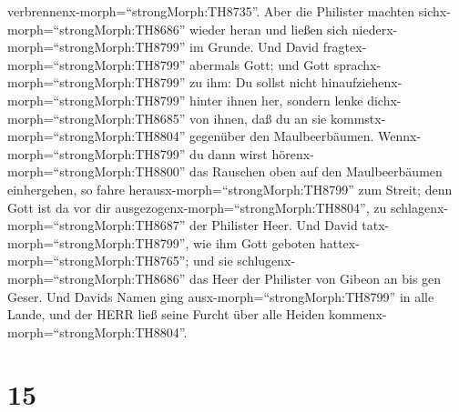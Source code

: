 verbrennenx-morph=``strongMorph:TH8735''.  Aber die
Philister machten sichx-morph=``strongMorph:TH8686'' wieder heran und
ließen sich niederx-morph=``strongMorph:TH8799'' im Grunde.
 Und David fragtex-morph=``strongMorph:TH8799'' abermals
Gott; und Gott sprachx-morph=``strongMorph:TH8799'' zu ihm: Du sollst
nicht hinaufziehenx-morph=``strongMorph:TH8799'' hinter ihnen her,
sondern lenke dichx-morph=``strongMorph:TH8685'' von ihnen, daß du an
sie kommstx-morph=``strongMorph:TH8804'' gegenüber den Maulbeerbäumen.
 Wennx-morph=``strongMorph:TH8799'' du dann wirst
hörenx-morph=``strongMorph:TH8800'' das Rauschen oben auf den
Maulbeerbäumen einhergehen, so fahre
herausx-morph=``strongMorph:TH8799'' zum Streit; denn Gott ist da vor
dir ausgezogenx-morph=``strongMorph:TH8804'', zu
schlagenx-morph=``strongMorph:TH8687'' der Philister Heer. 
Und David tatx-morph=``strongMorph:TH8799'', wie ihm Gott geboten
hattex-morph=``strongMorph:TH8765''; und sie
schlugenx-morph=``strongMorph:TH8686'' das Heer der Philister von Gibeon
an bis gen Geser.  Und Davids Namen ging
ausx-morph=``strongMorph:TH8799'' in alle Lande, und der HERR ließ seine
Furcht über alle Heiden kommenx-morph=``strongMorph:TH8804''.

\hypertarget{section-14}{%
\section{15}\label{section-14}}

